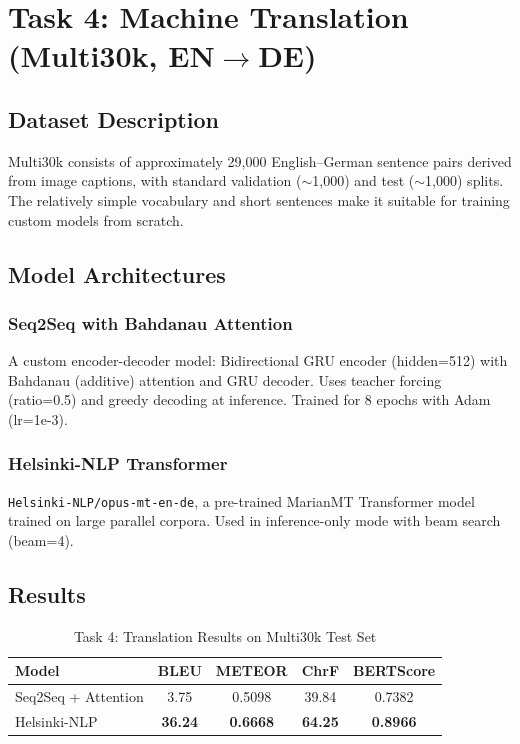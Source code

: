 \documentclass[12pt, a4paper]{article}
\begin{document}
\section{Task 4: Machine Translation (Multi30k, EN$\rightarrow$DE)}

\subsection{Dataset Description}

Multi30k consists of approximately 29,000 English--German sentence pairs derived from image captions, with standard validation ($\sim$1,000) and test ($\sim$1,000) splits. The relatively simple vocabulary and short sentences make it suitable for training custom models from scratch.

\subsection{Model Architectures}

\subsubsection{Seq2Seq with Bahdanau Attention}
A custom encoder-decoder model: Bidirectional GRU encoder (hidden=512) with Bahdanau (additive) attention and GRU decoder. Uses teacher forcing (ratio=0.5) and greedy decoding at inference. Trained for 8 epochs with Adam (lr=1e-3).

\subsubsection{Helsinki-NLP Transformer}
\texttt{Helsinki-NLP/opus-mt-en-de}, a pre-trained MarianMT Transformer model trained on large parallel corpora. Used in inference-only mode with beam search (beam=4).

\subsection{Results}

\begin{table}[H]
\centering
\caption{Task 4: Translation Results on Multi30k Test Set}
\label{tab:task4_results}
\begin{tabular}{lcccc}
\toprule
\textbf{Model} & \textbf{BLEU} & \textbf{METEOR} & \textbf{ChrF} & \textbf{BERTScore} \\
\midrule
Seq2Seq + Attention & 3.75 & 0.5098 & 39.84 & 0.7382 \\
Helsinki-NLP & \textbf{36.24} & \textbf{0.6668} & \textbf{64.25} & \textbf{0.8966} \\
\bottomrule
\end{tabular}
\end{table}
\end{document}
